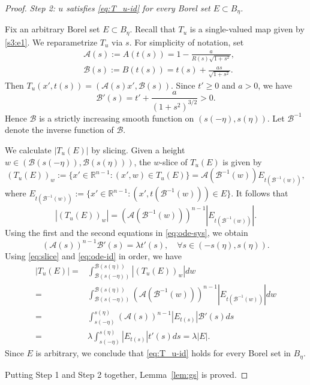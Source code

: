 \documentclass[12pt,letterpaper]{amsart}
\theoremstyle{definition}
\theoremstyle{plain}
\numberwithin{equation}{section}
\newcommand{\R}{\mathbb{R}}
\begin{document}
\begin{proof}
    {\it Step 2: $u$ satisfies \eqref{eq:T_u-id} for every Borel set $E\subset B_\eta$.}

    Fix an arbitrary Borel set $E\subset B_\eta$.
    Recall that $T_u$ is a single-valued map given by \eqref{s3:e1}.
    We reparametrize $T_u$ via $s$.
    For simplicity of notation, set
    \begin{align*}
        &\mathcal{A}(s):=A(t(s))=1-\frac{a}{R(s)\sqrt{1+s^2}},\\
    &\mathcal{B}(s):=B(t(s))=t(s)+\frac{as}{\sqrt{1+s^2}}.
    \end{align*}
    Then $T_u(x',t(s))=(\mathcal{A}(s)x',\mathcal{B}(s))$.
    Since $t'\geq 0$ and $a>0$, we have
    \[
    \mathcal{B}'(s)=t'+\frac{a}{(1+s^2)^{3/2}}>0.
    \]
    Hence $\mathcal{B}$ is a strictly increasing smooth function on $(s(-\eta),s(\eta))$.
    Let $\mathcal{B}^{-1}$ denote the inverse function of $\mathcal{B}$.

    We calculate $|T_u(E)|$ by slicing.
    Given a height $w\in(\mathcal{B}(s(-\eta)),\mathcal{B}(s(\eta)))$, the $w$-slice of $T_u(E)$ is given by
    \[
    (T_u(E))_w:=\{x'\in\R^{n-1}:(x',w)\in T_u(E)\}=\mathcal{A}(\mathcal{B}^{-1}(w))E_{t(\mathcal{B}^{-1}(w))},
    \]
    where $E_{t(\mathcal{B}^{-1}(w))}:=\{x'\in\R^{n-1}:(x',t(\mathcal{B}^{-1}(w)))\in E\}$.
    It follows that
    \begin{equation}\label{eq:slice}
        |(T_u(E))_w|=(\mathcal{A}(\mathcal{B}^{-1}(w)))^{n-1}|E_{t(\mathcal{B}^{-1}(w))}|.
    \end{equation}
    Using the first and the second equations in \eqref{eq:ode-sys}, we obtain
   \begin{equation}\label{eq:ode-id}
    (\mathcal{A}(s))^{n-1}\mathcal{B}'(s)=\lambda t'(s),\quad\forall s\in(-s(\eta),s(\eta)).
   \end{equation}
   Using \eqref{eq:slice} and \eqref{eq:ode-id} in order, we have
   \begin{align*}
    |T_u(E)|=&\int_{\mathcal{B}(s(-\eta))}^{\mathcal{B}(s(\eta))}|(T_u(E))_w|dw\\
    =&\int_{\mathcal{B}(s(-\eta))}^{\mathcal{B}(s(\eta))}(\mathcal{A}(\mathcal{B}^{-1}(w)))^{n-1}|E_{t(\mathcal{B}^{-1}(w))}|dw\\
    =&\int_{s(-\eta)}^{s(\eta)}(\mathcal{A}(s))^{n-1}|E_{t(s)}|\mathcal{B}'(s)ds\\
    =&\lambda\int_{s(-\eta)}^{s(\eta)}|E_{t(s)}|t'(s)ds=\lambda|E|.
   \end{align*}
   Since $E$ is arbitrary, we conclude that \eqref{eq:T_u-id} holds for every Borel set in $B_\eta$.

   Putting Step 1 and Step 2 together, Lemma~\ref{lem:gs} is proved.
\end{proof}
\end{document}
